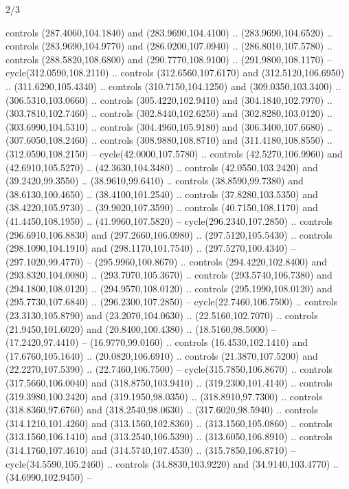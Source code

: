 \begin{flagdescription}{2/3}
\begin{scope}[xshift=0.5\flaglength,yshift=0.5\flagwidth,scale=\stretchfactor]
\begin{scope}[scale=0.001645\flagwidth,yshift=65mm,xshift=-63mm]
\begin{scope}[y=0.80pt, x=0.80pt, yscale=-1,]
\begin{scope}[cm={{1.33333,0.0,0.0,1.33333,(0.0,1e-05)}}]
  controls (287.4060,104.1840) and (283.9690,104.4100) .. (283.9690,104.6520) ..
  controls (283.9690,104.9770) and (286.0200,107.0940) .. (286.8010,107.5780) ..
  controls (288.5820,108.6800) and (290.7770,108.9100) .. (291.9800,108.1170) --
  cycle(312.0590,108.2110) .. controls (312.6560,107.6170) and
  (312.5120,106.6950) .. (311.6290,105.4340) .. controls (310.7150,104.1250) and
  (309.0350,103.3400) .. (306.5310,103.0660) .. controls (305.4220,102.9410) and
  (304.1840,102.7970) .. (303.7810,102.7460) .. controls (302.8440,102.6250) and
  (302.8280,103.0120) .. (303.6990,104.5310) .. controls (304.4960,105.9180) and
  (306.3400,107.6680) .. (307.6050,108.2460) .. controls (308.9880,108.8710) and
  (311.4180,108.8550) .. (312.0590,108.2150) -- cycle(42.0000,107.5780) ..
  controls (42.5270,106.9960) and (42.6910,105.5270) .. (42.3630,104.3480) ..
  controls (42.0550,103.2420) and (39.2420,99.3550) .. (38.9610,99.6410) ..
  controls (38.8590,99.7380) and (38.6130,100.4650) .. (38.4100,101.2540) ..
  controls (37.8280,103.5350) and (38.4220,105.9730) .. (39.9020,107.3590) ..
  controls (40.7150,108.1170) and (41.4450,108.1950) .. (41.9960,107.5820) --
  cycle(296.2340,107.2850) .. controls (296.6910,106.8830) and
  (297.2660,106.0980) .. (297.5120,105.5430) .. controls (298.1090,104.1910) and
  (298.1170,101.7540) .. (297.5270,100.4340) -- (297.1020,99.4770) --
  (295.9960,100.8670) .. controls (294.4220,102.8400) and (293.8320,104.0080) ..
  (293.7070,105.3670) .. controls (293.5740,106.7380) and (294.1800,108.0120) ..
  (294.9570,108.0120) .. controls (295.1990,108.0120) and (295.7730,107.6840) ..
  (296.2300,107.2850) -- cycle(22.7460,106.7500) .. controls (23.3130,105.8790)
  and (23.2070,104.0630) .. (22.5160,102.7070) .. controls (21.9450,101.6020)
  and (20.8400,100.4380) .. (18.5160,98.5000) -- (17.2420,97.4410) --
  (16.9770,99.0160) .. controls (16.4530,102.1410) and (17.6760,105.1640) ..
  (20.0820,106.6910) .. controls (21.3870,107.5200) and (22.2270,107.5390) ..
  (22.7460,106.7500) -- cycle(315.7850,106.8670) .. controls (317.5660,106.0040)
  and (318.8750,103.9410) .. (319.2300,101.4140) .. controls (319.3980,100.2420)
  and (319.1950,98.0350) .. (318.8910,97.7300) .. controls (318.8360,97.6760)
  and (318.2540,98.0630) .. (317.6020,98.5940) .. controls (314.1210,101.4260)
  and (313.1560,102.8360) .. (313.1560,105.0860) .. controls (313.1560,106.1410)
  and (313.2540,106.5390) .. (313.6050,106.8910) .. controls (314.1760,107.4610)
  and (314.5740,107.4530) .. (315.7850,106.8710) -- cycle(34.5590,105.2460) ..
  controls (34.8830,103.9220) and (34.9140,103.4770) .. (34.6990,102.9450) --

\end{scope}
\end{scope}
\end{scope}
\end{scope}
\end{flagdescription}
